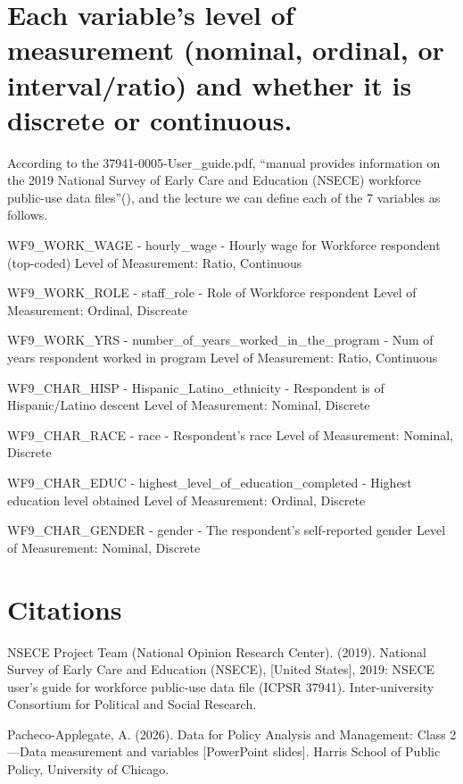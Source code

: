 \documentclass[
]{article}
\begin{document}
\section{Each variable's level of measurement (nominal, ordinal, or
interval/ratio) and whether it is discrete or
continuous.}\label{each-variables-level-of-measurement-nominal-ordinal-or-intervalratio-and-whether-it-is-discrete-or-continuous.}

According to the 37941-0005-User\_guide.pdf, ``manual provides
information on the 2019 National Survey of Early Care and Education
(NSECE) workforce public-use data files''(), and the lecture we can
define each of the 7 variables as follows.

WF9\_WORK\_WAGE - hourly\_wage - Hourly wage for Workforce respondent
(top-coded) Level of Measurement: Ratio, Continuous

WF9\_WORK\_ROLE - staff\_role - Role of Workforce respondent Level of
Measurement: Ordinal, Discreate

WF9\_WORK\_YRS - number\_of\_years\_worked\_in\_the\_program - Num of
years respondent worked in program Level of Measurement: Ratio,
Continuous

WF9\_CHAR\_HISP - Hispanic\_Latino\_ethnicity - Respondent is of
Hispanic/Latino descent Level of Measurement: Nominal, Discrete

WF9\_CHAR\_RACE - race - Respondent's race Level of Measurement:
Nominal, Discrete

WF9\_CHAR\_EDUC - highest\_level\_of\_education\_completed - Highest
education level obtained Level of Measurement: Ordinal, Discrete

WF9\_CHAR\_GENDER - gender - The respondent's self-reported gender Level
of Measurement: Nominal, Discrete

\section{Citations}\label{citations}

NSECE Project Team (National Opinion Research Center). (2019). National
Survey of Early Care and Education (NSECE), {[}United States{]}, 2019:
NSECE user's guide for workforce public-use data file (ICPSR 37941).
Inter-university Consortium for Political and Social Research.

Pacheco-Applegate, A. (2026). Data for Policy Analysis and Management:
Class 2---Data measurement and variables {[}PowerPoint slides{]}. Harris
School of Public Policy, University of Chicago.
\end{document}
